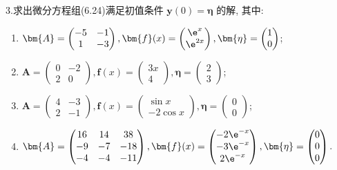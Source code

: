 3.求出微分方程组(6.24)满足初值条件 $\bm{y}(0)=\bm{\eta}$ 的解, 其中:
\begin{enumerate}[(1)]
\item $\bm{A}=\begin{pmatrix}-5&-1\\1&-3\end{pmatrix},\bm{f}(x)=\begin{pmatrix}\e^x\\\e^{2x}\end{pmatrix},\bm{\eta}=\begin{pmatrix}1\\0\end{pmatrix}$;
\item $\bm{A}=\begin{pmatrix}0&-2\\2&0\end{pmatrix},\bm{f}(x)=\begin{pmatrix}3x\\4\end{pmatrix},\bm{\eta}=\begin{pmatrix}2\\3\end{pmatrix}$;
\item $\bm{A}=\begin{pmatrix}4&-3\\2&-1\end{pmatrix},\bm{f}(x)=\begin{pmatrix}\sin x\\-2\cos x\end{pmatrix},\bm{\eta}=\begin{pmatrix}0\\0\end{pmatrix}$;
\item $\bm{A}=\begin{pmatrix}16&14&38\\-9&-7&-18\\-4&-4&-11\end{pmatrix},\bm{f}(x)=\begin{pmatrix}-2\e^{-x}\\-3\e^{-x}\\2\e^{-x}\end{pmatrix},\bm{\eta}=\begin{pmatrix}0\\0\\0\end{pmatrix}$.
\end{enumerate}

